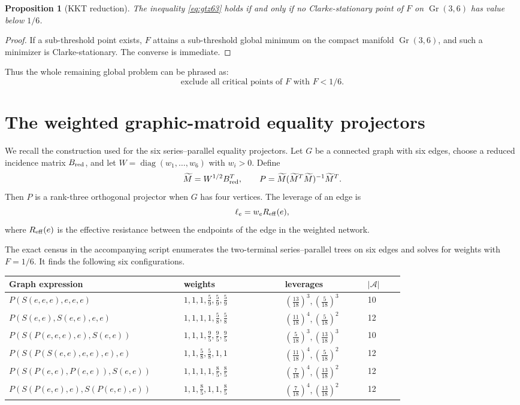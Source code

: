 \documentclass[11pt]{article}
\numberwithin{equation}{section}
\newtheorem{proposition}[theorem]{Proposition}
\theoremstyle{definition}
\newcommand{\Gr}{\operatorname{Gr}}
\newcommand{\diag}{\operatorname{diag}}
\newcommand{\cA}{\mathcal A}
\begin{document}
\begin{proposition}[KKT reduction]\label{prop:kkt}
The inequality \eqref{eq:gtz63} holds if and only if no Clarke-stationary point
of $F$ on $\Gr(3,6)$ has value below $1/6$.
\end{proposition}

\begin{proof}
If a sub-threshold point exists, $F$ attains a sub-threshold global minimum on
the compact manifold $\Gr(3,6)$, and such a minimizer is Clarke-stationary.  The
converse is immediate.
\end{proof}

Thus the whole remaining global problem can be phrased as:
\[
  \text{exclude all critical points of }F\text{ with }F<1/6.
\]

\section{The weighted graphic-matroid equality projectors}

We recall the construction used for the six series--parallel equality
projectors.  Let $G$ be a connected graph with six edges, choose a reduced
incidence matrix $B_{\rm red}$, and let $W=\diag(w_1,\ldots,w_6)$ with
$w_i>0$.  Define
\[
  \widetilde M=W^{1/2}B_{\rm red}^T,\qquad
  P=\widetilde M(\widetilde M^T\widetilde M)^{-1}\widetilde M^T.
\]
Then $P$ is a rank-three orthogonal projector when $G$ has four vertices.  The
leverage of an edge is
\[
  \ell_e=w_e R_{\rm eff}(e),
\]
where $R_{\rm eff}(e)$ is the effective resistance between the endpoints of the
edge in the weighted network.

The exact census in the accompanying script enumerates the two-terminal
series--parallel trees on six edges and solves for weights with $F=1/6$.
It finds the following six configurations.

\begin{center}
\begin{tabular}{p{0.38\linewidth}p{0.22\linewidth}p{0.18\linewidth}p{0.08\linewidth}}
\hline
Graph expression & weights & leverages & $|\cA|$\\
\hline
$P(S(e,e,e),e,e,e)$
& $1,1,1,\frac59,\frac59,\frac59$
& $(\frac{13}{18})^3,(\frac5{18})^3$ & 10\\
$P(S(e,e),S(e,e),e,e)$
& $1,1,1,1,\frac58,\frac58$
& $(\frac{11}{18})^4,(\frac5{18})^2$ & 12\\
$P(S(P(e,e,e),e),S(e,e))$
& $1,1,1,\frac95,\frac95,\frac95$
& $(\frac5{18})^3,(\frac{13}{18})^3$ & 10\\
$P(S(P(S(e,e),e,e),e),e)$
& $1,1,\frac58,\frac58,1,1$
& $(\frac{11}{18})^4,(\frac5{18})^2$ & 12\\
$P(S(P(e,e),P(e,e)),S(e,e))$
& $1,1,1,1,\frac85,\frac85$
& $(\frac7{18})^4,(\frac{13}{18})^2$ & 12\\
$P(S(P(e,e),e),S(P(e,e),e))$
& $1,1,\frac85,1,1,\frac85$
& $(\frac7{18})^4,(\frac{13}{18})^2$ & 12\\
\hline
\end{tabular}
\end{center}
\end{document}
